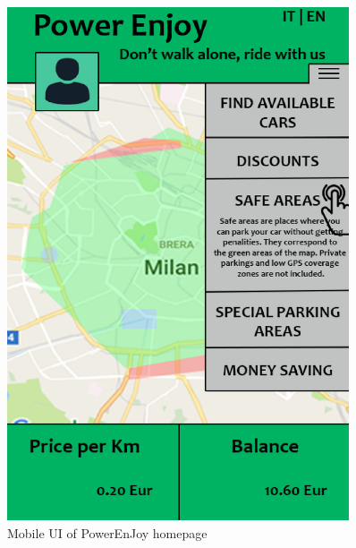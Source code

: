 \begin{figure}[t]
\begin{minipage}{0.45\textwidth}
		\includegraphics[width=0.9\textwidth]{figures/mobile_logged.eps}
		\caption{Mobile UI of PowerEnJoy homepage}
		\label{fig:mobile_logged}
	\end{minipage}
\end{figure}

